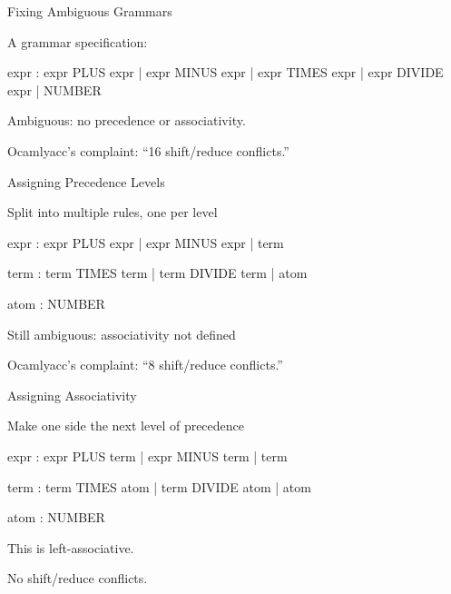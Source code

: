 \documentclass{plt}
\begin{document}
\begin{frame}[fragile]{Fixing Ambiguous Grammars}

A grammar specification:

\begin{ocamlyacc}
expr :
    expr PLUS expr  
  | expr MINUS expr 
  | expr TIMES expr 
  | expr DIVIDE expr
  | NUMBER          
\end{ocamlyacc}

Ambiguous: no precedence or associativity.

Ocamlyacc's complaint: ``16 shift/reduce conflicts.''

\end{frame}

\begin{frame}[fragile]{Assigning Precedence Levels}

Split into multiple rules, one per level

\begin{ocamlyacc}
expr : expr PLUS expr  
     | expr MINUS expr 
     | term            

term : term TIMES term 
     | term DIVIDE term
     | atom            

atom  : NUMBER         
\end{ocamlyacc}

Still ambiguous: associativity not defined

Ocamlyacc's complaint: ``8 shift/reduce conflicts.''

\end{frame}

\begin{frame}[fragile]{Assigning Associativity}

Make one side the next level of precedence

\begin{ocamlyacc}
expr : expr PLUS term  
     | expr MINUS term 
     | term            

term : term TIMES atom 
     | term DIVIDE atom
     | atom            

atom  : NUMBER         
\end{ocamlyacc}

This is left-associative.

No shift/reduce conflicts.

\end{frame}
\end{document}
